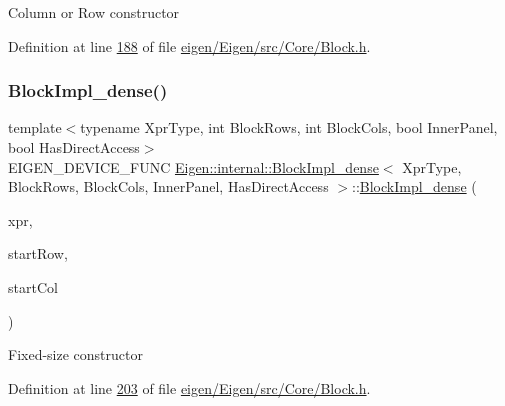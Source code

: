 Column or Row constructor 

Definition at line \hyperlink{eigen_2_eigen_2src_2_core_2_block_8h_source_l00188}{188} of file \hyperlink{eigen_2_eigen_2src_2_core_2_block_8h_source}{eigen/\+Eigen/src/\+Core/\+Block.\+h}.

\mbox{\label{class_eigen_1_1internal_1_1_block_impl__dense_aa77daae8d8aef85ce9445cfd23363cbf}} 
\subsubsection{\texorpdfstring{Block\+Impl\+\_\+dense()}{BlockImpl\_dense()}\hspace{0.1cm}{\footnotesize\ttfamily [2/6]}}
{\footnotesize\ttfamily template$<$typename Xpr\+Type, int Block\+Rows, int Block\+Cols, bool Inner\+Panel, bool Has\+Direct\+Access$>$ \\
E\+I\+G\+E\+N\+\_\+\+D\+E\+V\+I\+C\+E\+\_\+\+F\+U\+NC \hyperlink{class_eigen_1_1internal_1_1_block_impl__dense}{Eigen\+::internal\+::\+Block\+Impl\+\_\+dense}$<$ Xpr\+Type, Block\+Rows, Block\+Cols, Inner\+Panel, Has\+Direct\+Access $>$\+::\hyperlink{class_eigen_1_1internal_1_1_block_impl__dense}{Block\+Impl\+\_\+dense} (\begin{DoxyParamCaption}\item[{Xpr\+Type \&}]{xpr,  }\item[{\hyperlink{namespace_eigen_a62e77e0933482dafde8fe197d9a2cfde}{Index}}]{start\+Row,  }\item[{\hyperlink{namespace_eigen_a62e77e0933482dafde8fe197d9a2cfde}{Index}}]{start\+Col }\end{DoxyParamCaption})\hspace{0.3cm}{\ttfamily [inline]}}

Fixed-\/size constructor 

Definition at line \hyperlink{eigen_2_eigen_2src_2_core_2_block_8h_source_l00203}{203} of file \hyperlink{eigen_2_eigen_2src_2_core_2_block_8h_source}{eigen/\+Eigen/src/\+Core/\+Block.\+h}.

\mbox{\label{class_eigen_1_1internal_1_1_block_impl__dense_a187c7918e6f200bf1d7d9a9c2f608547}} 
